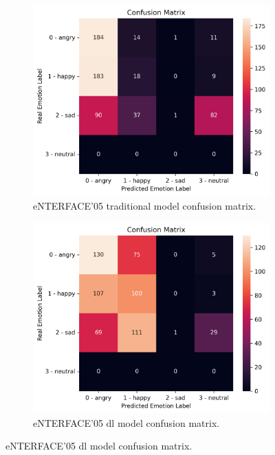 \begin{figure}
	\begin{subfigure}{.5\textwidth}
		\centering
		\includegraphics[width=\linewidth]{figs/4_5_discussion/ent_trad_cm.png}
		\caption{eNTERFACE'05 traditional model confusion matrix.}
	\end{subfigure}%
	\begin{subfigure}{.5\textwidth}
		\centering
		\includegraphics[width=\linewidth]{figs/4_5_discussion/ent_deep_cm.png}
		\caption{eNTERFACE'05 \ac{dl} model confusion matrix.}
	\end{subfigure}
	\newline

\end{figure}
